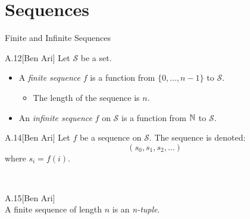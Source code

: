 \documentclass[style=sailor,size=12pt]{powerdot}
\begin{document}
\section[slide=false]{Sequences}
\begin{slide}[bm=,toc=]{Finite and Infinite Sequences}
\begin{defn}{A.12}[Ben Ari]
Let $\mathcal{S}$ be a set.
\begin{itemize}
    \item A \emph{finite sequence} $f$ is a function from $\{0,...,n-1\}$ to $\mathcal{S}$.
    \begin{itemize}
        \item The length of the sequence is $n$.
    \end{itemize}
    \item An \emph{infinite sequence} $f$ on $\mathcal{S}$ is a function from $\mathbb{N}$ to $\mathcal{S}$.
    \end{itemize}
\end{defn}
\begin{defn}{A.14}[Ben Ari]
Let $f$ be a sequence on $\mathcal{S}$. The sequence is denoted:
\[
  (s_0,s_1,s_2,...)
  \]
where $s_i = f(i)$.
\end{defn}
~\\
\begin{defn}{A.15}[Ben Ari]
~\\
A finite sequence of length $n$ is an \emph{n-tuple}.
\end{defn}

\end{slide}
\end{document}
